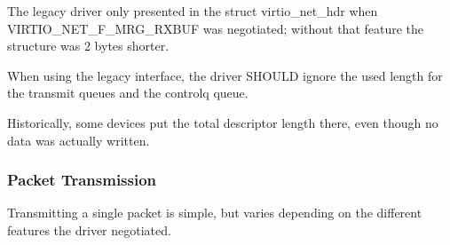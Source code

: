 The legacy driver only presented  in the struct virtio_net_hdr
when VIRTIO_NET_F_MRG_RXBUF was negotiated; without that feature the
structure was 2 bytes shorter.

When using the legacy interface, the driver SHOULD ignore the
used length for the transmit queues
and the controlq queue.
\begin{note}
Historically, some devices put
the total descriptor length there, even though no data was
actually written.
\end{note}

\subsubsection{Packet Transmission}\label{sec:Device Types / Network Device / Device Operation / Packet Transmission}

Transmitting a single packet is simple, but varies depending on
the different features the driver negotiated.

